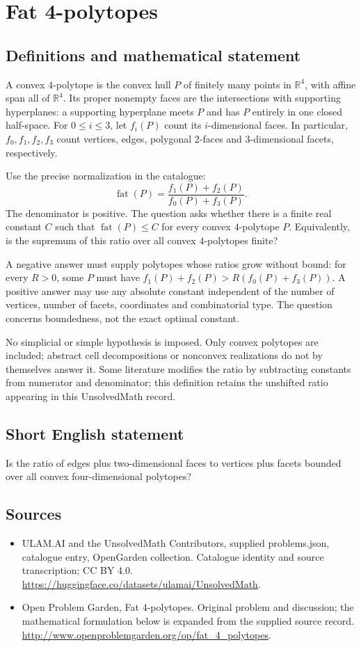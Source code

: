 \documentclass[11pt,a4paper]{article}
\begin{document}
\section*{Fat 4-polytopes}\label{statement}

\subsection{Definitions and mathematical statement}
A convex $4$-polytope is the convex hull $P$ of finitely many points in
$\mathbb R^4$, with affine span all of $\mathbb R^4$. Its proper nonempty
faces are the intersections with supporting hyperplanes: a supporting
hyperplane meets $P$ and has $P$ entirely in one closed half-space.
For $0\le i\le3$, let $f_i(P)$ count its $i$-dimensional faces.
In particular, $f_0,f_1,f_2,f_3$ count vertices, edges, polygonal
$2$-faces and $3$-dimensional facets, respectively.

Use the precise normalization in the catalogue:
\[
 \operatorname{fat}(P)=\frac{f_1(P)+f_2(P)}{f_0(P)+f_3(P)}.
\]
The denominator is positive. The question asks whether there is a
finite real constant $C$ such that $\operatorname{fat}(P)\le C$ for
every convex $4$-polytope $P$.
Equivalently, is the supremum of this ratio over all convex
$4$-polytopes finite?

A negative answer must supply polytopes whose ratios grow without bound:
for every $R>0$, some $P$ must have $f_1(P)+f_2(P)>R(f_0(P)+f_3(P))$.
A positive answer may use any absolute constant independent of the
number of vertices, number of facets, coordinates and combinatorial type.
The question concerns boundedness, not the exact optimal constant.

No simplicial or simple hypothesis is imposed. Only convex polytopes are
included; abstract cell decompositions or nonconvex realizations do not
by themselves answer it. Some literature modifies the ratio by subtracting
constants from numerator and denominator; this definition retains the
unshifted ratio appearing in this UnsolvedMath record.
\subsection{Short English statement}
Is the ratio of edges plus two-dimensional faces to vertices plus facets bounded over all convex four-dimensional polytopes?
\subsection{Sources}
\begin{itemize}
\item[S1] ULAM.AI and the UnsolvedMath Contributors, supplied problems.json, catalogue entry, OpenGarden collection. Catalogue identity and source transcription; CC BY 4.0.
\url{https://huggingface.co/datasets/ulamai/UnsolvedMath}.
\item[S2] Open Problem Garden, Fat 4-polytopes. Original problem and discussion; the mathematical formulation below is expanded from the supplied source record.
\url{http://www.openproblemgarden.org/op/fat_4_polytopes}.
\end{itemize}
\end{document}

